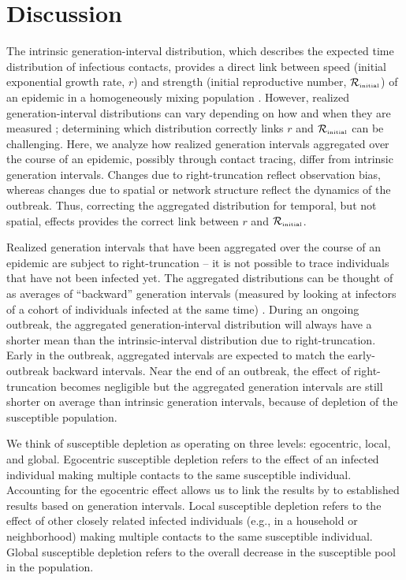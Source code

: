 \documentclass[12pt]{article}
\newcommand{\Rx}[1]{\ensuremath{{\mathcal R}_{#1}}\xspace}
\newcommand{\Rini}{\Rx{\textrm{\tiny initial}}}
\begin{document}
\section{Discussion}

The intrinsic generation-interval distribution, which describes the expected time distribution of infectious contacts, provides a direct link between speed (initial exponential growth rate, $r$) and strength (initial reproductive number, $\Rini$) of an epidemic in a homogeneously mixing population \citep{wallinga2007generation, svensson2007note, svensson2015influence, park2019practical}.
However, realized generation-interval distributions can vary depending on how and when they are measured \citep{nishiura2010time, tomba2010some, champredon2015intrinsic, britton2019estimation};
determining which distribution correctly links $r$ and $\Rini$ can be challenging.
Here, we analyze how realized generation intervals aggregated over the course of an epidemic, possibly through contact tracing, differ from intrinsic generation intervals.
Changes due to right-truncation reflect observation bias, whereas changes due to spatial or network structure reflect the dynamics of the outbreak.
Thus, correcting the aggregated distribution for temporal, but not spatial, effects provides the correct link between $r$ and $\Rini$.

Realized generation intervals that have been aggregated over the course of an epidemic are subject to right-truncation -- it is not possible to trace individuals that have not been infected yet.
The aggregated distributions can be thought of as averages of ``backward'' generation intervals (measured by looking at infectors of a cohort of individuals infected at the same time) \citep{kenah2008generation, nishiura2010time, tomba2010some, champredon2015intrinsic, britton2019estimation}.
During an ongoing outbreak, the aggregated generation-interval distribution will always have a shorter mean than the intrinsic-interval distribution due to right-truncation.
Early in the outbreak, aggregated intervals are expected to match the early-outbreak backward intervals.
Near the end of an outbreak, the effect of right-truncation becomes negligible but the aggregated generation intervals are still shorter on average than intrinsic generation intervals, because of depletion of the susceptible population.

We think of susceptible depletion as operating on three levels: egocentric, local, and global.
Egocentric susceptible depletion refers to the effect of an infected individual making multiple contacts to the same susceptible individual.
Accounting for the egocentric effect allows us to link the results by \cite{trapman2016inferring} to established results based on generation intervals.
Local susceptible depletion refers to the effect of other closely related infected individuals (e.g., in a household or neighborhood) making multiple contacts to the same susceptible individual.
Global susceptible depletion refers to the overall decrease in the susceptible pool in the population.
\end{document}

